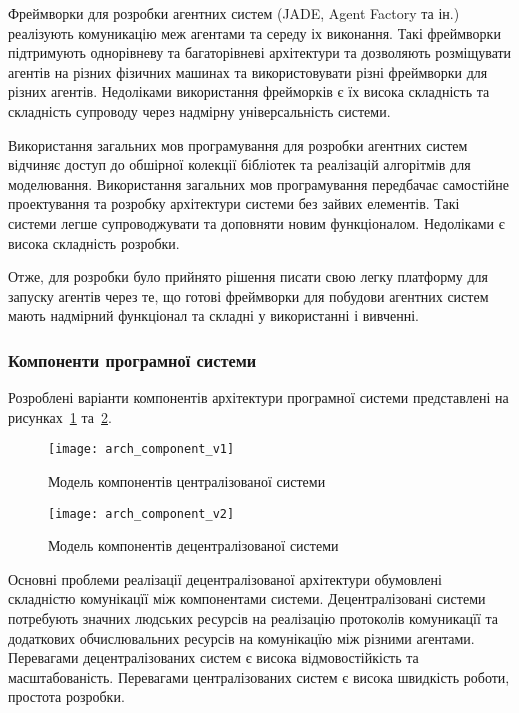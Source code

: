 Фреймворки для розробки агентних систем (JADE, Agent Factory та ін.) реалізують комуникацію меж агентами та середу іх виконання. Такі фреймворки підтримують однорівневу та багаторівневі архітектури та дозволяють розміщувати агентів на різних фізичних машинах та використовувати різні фреймворки для різних агентів. Недоліками використання фрейморків є їх висока складність та складність супроводу через надмірну універсальність системи.

Використання загальних мов програмування для розробки агентних систем відчиняє доступ до обшірної колекції бібліотек та реалізацій алгорітмів для моделювання. Використання загальних мов програмування передбачає самостійне проектування та розробку архітектури системи без зайвих елементів. Такі системи легше супроводжувати та доповняти новим функціоналом. Недоліками є висока складність розробки.

Отже, для розробки було прийнято рішення писати свою легку платформу для запуску агентів через те, що готові фреймворки для побудови агентних систем мають надмірний функціонал та складні у використанні і вивченні.

\subsubsection{Компоненти програмної системи}
Розроблені варіанти компонентів архітектури програмної системи представлені на рисунках~\ref{fig:arch_component_v1} та~\ref{fig:arch_component_v2}.

\begin{figure}[H]
	\centering
	\texttt{[image: arch\_component\_v1]}
	\caption{Модель компонентів централізованої системи}
	\label{fig:arch_component_v1}
\end{figure} 

\begin{figure}[H]
	\centering
	\texttt{[image: arch\_component\_v2]}
	\caption{Модель компонентів децентралізованої системи}
	\label{fig:arch_component_v2}
\end{figure} 

Основні проблеми реалізації децентралізованої архітектури обумовлені складністю комунікацїї між компонентами системи. Децентралізовані системи потребують значних людських ресурсів на реалізацію протоколів комуникацїї та додаткових обчислювальних ресурсів на комунікацїю між різними агентами.
Перевагами децентралізованих систем є висока відмовостійкість та масштабованість.
Перевагами централізованих систем є висока швидкість роботи, простота розробки.

